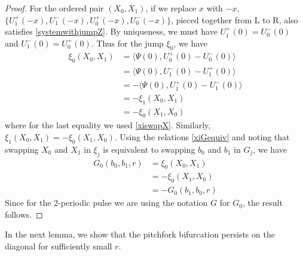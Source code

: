 \documentclass[thesis.tex]{subfiles}
\begin{document}
\begin{lemma}
\begin{proof}
For the ordered pair $(X_0, X_1)$, if we replace $x$ with $-x$, $\{ U_1^+(-x), U_1^-(-x), U_0^+(-x), U_0^-(-x)\}$, pieced together from L to R, also satisfies \eqref{systemwithjumpZ}. By uniqueness, we must have $U_1^+(0) = U_0^-(0)$ and $U_1^-(0) = U_0^+(0)$. Thus for the jump $\xi_0$, we have
\begin{align*}
\xi_0(X_0, X_1) &= \langle \Psi(0), U_0^+(0) - U_0^-(0) \rangle \\
&= \langle \Psi(0), U_1^-(0) - U_1^+(0) \rangle \\
&= -\langle \Psi(0), U_1^+(0) - U_1^-(0) \rangle \\
&= -\xi_1(X_0, X_1) \\
&= -\xi_0(X_1, X_0)
\end{align*}
where for the last equality we used \eqref{xiswapX}. Similarly, $\xi_1(X_0, X_1) = -\xi_0(X_1, X_0)$. Using the relations \eqref{xiGequiv} and noting that swapping $X_0$ and $X_1$ in $\xi_j$ is equivalent to swapping $b_0$ and $b_1$ in $G_j$, we have
\begin{align*}
G_0(b_0, b_1, r) &= \xi_0(X_0, X_1) \\
&= -\xi_0(X_1, X_0) \\
&= -G_0(b_1, b_0, r)
\end{align*}
Since for the 2-periodic pulse we are using the notation $G$ for $G_0$, the result follows.
\end{proof}
\end{lemma}

In the next lemma, we show that the pitchfork bifurcation persists on the diagonal for sufficiently small $r$.
\end{document}
